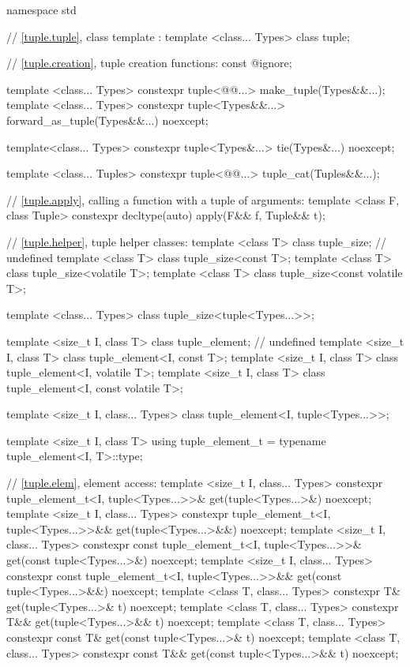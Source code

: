 %
\begin{codeblock}
namespace std {
  // \ref{tuple.tuple}, class template :
  template <class... Types> class tuple;

  // \ref{tuple.creation}, tuple creation functions:
  const @\unspec@ ignore;

  template <class... Types>
    constexpr tuple<@@...> make_tuple(Types&&...);
  template <class... Types>
    constexpr tuple<Types&&...> forward_as_tuple(Types&&...) noexcept;

  template<class... Types>
    constexpr tuple<Types&...> tie(Types&...) noexcept;

  template <class... Tuples>
    constexpr tuple<@@...> tuple_cat(Tuples&&...);

  // \ref{tuple.apply}, calling a function with a tuple of arguments:
  template <class F, class Tuple>
    constexpr decltype(auto) apply(F&& f, Tuple&& t);

  // \ref{tuple.helper}, tuple helper classes:
  template <class T> class tuple_size;  // undefined
  template <class T> class tuple_size<const T>;
  template <class T> class tuple_size<volatile T>;
  template <class T> class tuple_size<const volatile T>;

  template <class... Types> class tuple_size<tuple<Types...>>;

  template <size_t I, class T> class tuple_element;    // undefined
  template <size_t I, class T> class tuple_element<I, const T>;
  template <size_t I, class T> class tuple_element<I, volatile T>;
  template <size_t I, class T> class tuple_element<I, const volatile T>;

  template <size_t I, class... Types> class tuple_element<I, tuple<Types...>>;

  template <size_t I, class T>
    using tuple_element_t = typename tuple_element<I, T>::type;

  // \ref{tuple.elem}, element access:
  template <size_t I, class... Types>
    constexpr tuple_element_t<I, tuple<Types...>>&
      get(tuple<Types...>&) noexcept;
  template <size_t I, class... Types>
    constexpr tuple_element_t<I, tuple<Types...>>&&
      get(tuple<Types...>&&) noexcept;
  template <size_t I, class... Types>
    constexpr const tuple_element_t<I, tuple<Types...>>&
      get(const tuple<Types...>&) noexcept;
  template <size_t I, class... Types>
    constexpr const tuple_element_t<I, tuple<Types...>>&&
      get(const tuple<Types...>&&) noexcept;
  template <class T, class... Types>
    constexpr T& get(tuple<Types...>& t) noexcept;
  template <class T, class... Types>
    constexpr T&& get(tuple<Types...>&& t) noexcept;
  template <class T, class... Types>
    constexpr const T& get(const tuple<Types...>& t) noexcept;
  template <class T, class... Types>
    constexpr const T&& get(const tuple<Types...>&& t) noexcept;

}
\end{codeblock}
